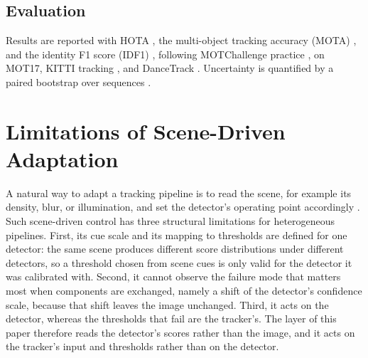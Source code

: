 \documentclass[journal]{new-aiaa}
\begin{document}
\subsection{Evaluation}
Results are reported with HOTA \cite{luiten2021hota}, the multi-object tracking accuracy (MOTA) \cite{bernardin2008clear}, and the identity F1 score (IDF1) \cite{ristani2016idf1}, following MOTChallenge practice \cite{dendorfer2021motchallenge,milan2016mot16}, on MOT17, KITTI tracking \cite{geiger2012kitti}, and DanceTrack \cite{sun2022dancetrack}. Uncertainty is quantified by a paired bootstrap over sequences \cite{efron1993bootstrap}.

\section{Limitations of Scene-Driven Adaptation}\label{sec:scene}
A natural way to adapt a tracking pipeline is to read the scene, for example its density, blur, or illumination, and set the detector's operating point accordingly \cite{jiang2018chameleon}. Such scene-driven control has three structural limitations for heterogeneous pipelines. First, its cue scale and its mapping to thresholds are defined for one detector: the same scene produces different score distributions under different detectors, so a threshold chosen from scene cues is only valid for the detector it was calibrated with. Second, it cannot observe the failure mode that matters most when components are exchanged, namely a shift of the detector's confidence scale, because that shift leaves the image unchanged. Third, it acts on the detector, whereas the thresholds that fail are the tracker's. The layer of this paper therefore reads the detector's scores rather than the image, and it acts on the tracker's input and thresholds rather than on the detector.
\end{document}

